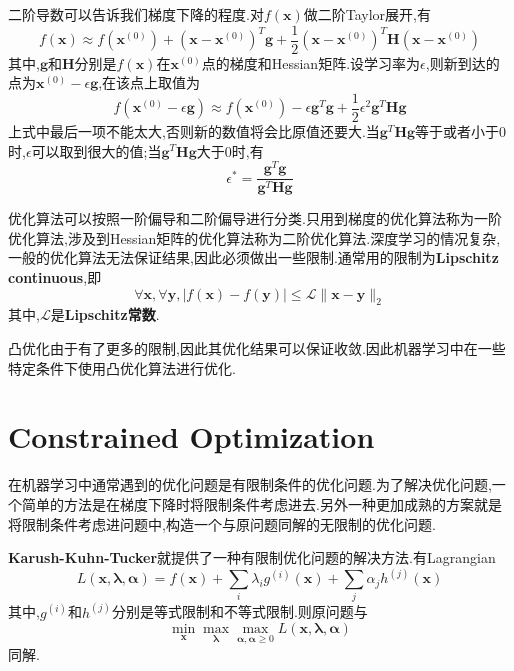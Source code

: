 二阶导数可以告诉我们梯度下降的程度.对$f(\bm x)$做二阶Taylor展开,有
\begin{equation}
f(\bm x)\approx f(\bm x^{(0)})+(\bm x-\bm x^{(0)})^T\bm g+\frac{1}{2}(\bm x-\bm x^{(0)})^T\bm H(\bm x-\bm x^{(0)})
\end{equation}
其中,$\bm g$和$\bm H$分别是$f(\bm x)$在$\bm x^{(0)}$点的梯度和Hessian矩阵.设学习率为$\epsilon$,则新到达的点为$\bm x^{(0)}-\epsilon\bm g$,在该点上取值为
\begin{equation}\label{eq:second_order_taylor_expansion}
f(\bm x^{(0)}-\epsilon\bm g)\approx f(\bm x^{(0)})-\epsilon\bm g^T\bm g+\frac{1}{2}\epsilon^2\bm g^T\bm{Hg}
\end{equation}
上式中最后一项不能太大,否则新的数值将会比原值还要大.当$\bm g^T\bm{Hg}$等于或者小于$0$时,$\epsilon$可以取到很大的值;当$\bm g^T\bm{Hg}$大于$0$时,有
\begin{equation}
\epsilon^\ast=\frac{\bm g^T\bm g}{\bm g^T\bm{Hg}}
\end{equation}

优化算法可以按照一阶偏导和二阶偏导进行分类.只用到梯度的优化算法称为一阶优化算法,涉及到Hessian矩阵的优化算法称为二阶优化算法.深度学习的情况复杂,一般的优化算法无法保证结果,因此必须做出一些限制.通常用的限制为\textbf{Lipschitz continuous},即
\begin{equation}
\forall\bm x,\forall\bm y,|f(\bm x)-f(\bm y)|\le\mathcal L\|\bm{x-y}\|_2
\end{equation}
其中,$\mathcal L$是\textbf{Lipschitz常数}.

凸优化由于有了更多的限制,因此其优化结果可以保证收敛.因此机器学习中在一些特定条件下使用凸优化算法进行优化.

\section{Constrained Optimization}
在机器学习中通常遇到的优化问题是有限制条件的优化问题.为了解决优化问题,一个简单的方法是在梯度下降时将限制条件考虑进去.另外一种更加成熟的方案就是将限制条件考虑进问题中,构造一个与原问题同解的无限制的优化问题.

\textbf{Karush-Kuhn-Tucker}就提供了一种有限制优化问题的解决方法.有Lagrangian
\begin{equation}
L(\bm{x,\lambda,\alpha})=f(\bm x)+\sum_i\lambda_ig^{(i)}(\bm x)+\sum_j\alpha_jh^{(j)}(\bm x)
\end{equation}
其中,$g^{(i)}$和$h^{(j)}$分别是等式限制和不等式限制.则原问题与
\begin{equation}
\min_{\bm x}\max_{\bm\lambda}\max_{\bm{\alpha,\alpha}\ge 0}L(\bm{x,\lambda,\alpha})
\end{equation}
同解.